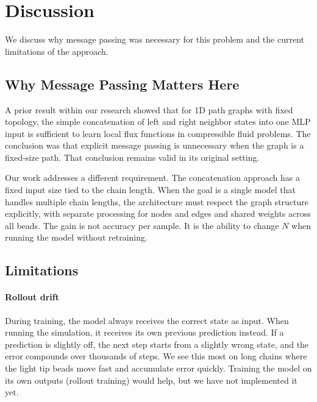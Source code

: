 \documentclass[conference]{IEEEtran}
\begin{document}
\section{Discussion}

We discuss why message passing was necessary for this problem and the current limitations of the approach.

\subsection{Why Message Passing Matters Here}

A prior result within our research showed that for 1D path graphs with fixed topology, the simple concatenation of left and right neighbor states into one MLP input is sufficient to learn local flux functions in compressible fluid problems. The conclusion was that explicit message passing is unnecessary when the graph is a fixed-size path. That conclusion remains valid in its original setting.

Our work addresses a different requirement. The concatenation approach has a fixed input size tied to the chain length. When the goal is a single model that handles multiple chain lengths, the architecture must respect the graph structure explicitly, with separate processing for nodes and edges and shared weights across all beads. The gain is not accuracy per sample. It is the ability to change $N$ when running the model without retraining.

\subsection{Limitations}

\paragraph{Rollout drift} During training, the model always receives the correct state as input. When running the simulation, it receives its own previous prediction instead. If a prediction is slightly off, the next step starts from a slightly wrong state, and the error compounds over thousands of steps. We see this most on long chains where the light tip beads move fast and accumulate error quickly. Training the model on its own outputs (rollout training) would help, but we have not implemented it yet.
\end{document}
